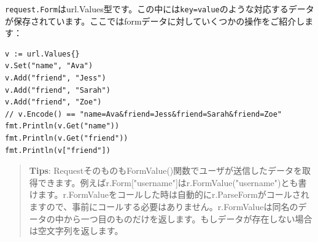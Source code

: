 \texttt{request.Form}はurl.Values型です。この中には\texttt{key=value}のような対応するデータが保存されています。ここではformデータに対していくつかの操作をご紹介します：

\begin{lstlisting}[numbers=none]
v := url.Values{}
v.Set("name", "Ava")
v.Add("friend", "Jess")
v.Add("friend", "Sarah")
v.Add("friend", "Zoe")
// v.Encode() == "name=Ava&friend=Jess&friend=Sarah&friend=Zoe"
fmt.Println(v.Get("name"))
fmt.Println(v.Get("friend"))
fmt.Println(v["friend"])
\end{lstlisting}

\begin{quote}
\textbf{Tips}: RequestそのものもFormValue()関数でユーザが送信したデータを取得できます。例えばr.Form["username"]はr.FormValue("username")とも書けます。r.FormValueをコールした時は自動的にr.ParseFormがコールされますので、事前にコールする必要はありません。r.FormValueは同名のデータの中から一つ目のものだけを返します。もしデータが存在しない場合は空文字列を返します。
\end{quote}


